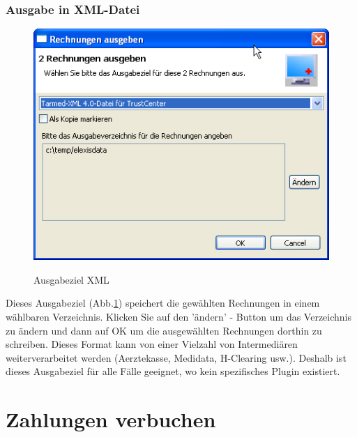 \documentclass[a4paper]{scrartcl}
\begin{document}
\subsubsection{Ausgabe in XML-Datei}
\begin{figure}
  \includegraphics{abr16}\\
  \caption{Ausgabeziel XML}\label{fig:abr16}
\end{figure}

Dieses Ausgabeziel (Abb.\ref{fig:abr16}) speichert die gewählten Rechnungen in einem wählbaren Verzeichnis. Klicken Sie auf den 'ändern' - Button um das Verzeichnis zu ändern und dann auf OK um die ausgewählten Rechnungen dorthin zu schreiben. Dieses Format kann von einer Vielzahl von Intermediären weiterverarbeitet werden (Aerztekasse, Medidata, H-Clearing usw.). Deshalb ist dieses Ausgabeziel für alle Fälle geeignet, wo kein spezifisches Plugin existiert.

\section{Zahlungen verbuchen}
\end{document}
